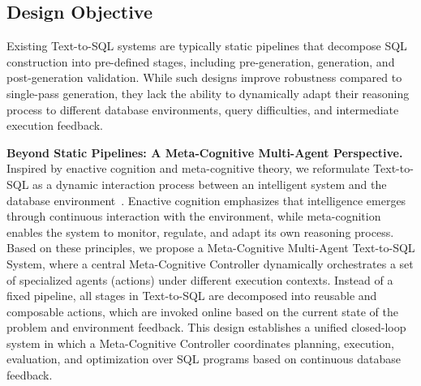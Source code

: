 
\vspace{-2mm}
\subsection{Design Objective}
Existing Text-to-SQL systems are typically static pipelines that decompose SQL construction into pre-defined stages, including pre-generation, generation, and post-generation validation. 
While such designs improve robustness compared to single-pass generation, they lack the ability to dynamically adapt their reasoning process to different database environments, query difficulties, and intermediate execution feedback.

\textbf{Beyond Static Pipelines: A Meta-Cognitive Multi-Agent Perspective.}
Inspired by enactive cognition and meta-cognitive theory, we reformulate Text-to-SQL as a dynamic interaction process between an intelligent system and the database environment~\cite{varela1991embodied,flavell1979metacognition}.
Enactive cognition emphasizes that intelligence emerges through continuous interaction with the environment, while meta-cognition enables the system to monitor, regulate, and adapt its own reasoning process.
Based on these principles, we propose a Meta-Cognitive Multi-Agent Text-to-SQL System, where a central Meta-Cognitive Controller dynamically orchestrates a set of specialized agents (actions) under different execution contexts.
Instead of a fixed pipeline, all stages in Text-to-SQL are decomposed into reusable and composable actions, which are invoked online based on the current state of the problem and environment feedback.
This design establishes a unified closed-loop system in which a Meta-Cognitive Controller coordinates planning, execution, evaluation, and optimization over SQL programs based on continuous database feedback.

